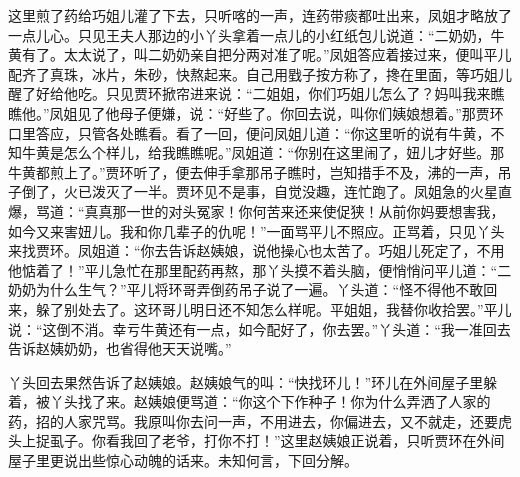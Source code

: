 \begin{parag}
    这里煎了药给巧姐儿灌了下去，只听喀的一声，连药带痰都吐出来，凤姐才略放了一点儿心。只见王夫人那边的小丫头拿着一点儿的小红纸包儿说道：“二奶奶，牛黄有了。太太说了，叫二奶奶亲自把分两对准了呢。”凤姐答应着接过来，便叫平儿配齐了真珠，冰片，朱砂，快熬起来。自己用戥子按方称了，搀在里面，等巧姐儿醒了好给他吃。只见贾环掀帘进来说：“二姐姐，你们巧姐儿怎么了？妈叫我来瞧瞧他。”凤姐见了他母子便嫌，说：“好些了。你回去说，叫你们姨娘想着。”那贾环口里答应，只管各处瞧看。看了一回，便问凤姐儿道：“你这里听的说有牛黄，不知牛黄是怎么个样儿，给我瞧瞧呢。”凤姐道：“你别在这里闹了，妞儿才好些。那牛黄都煎上了。”贾环听了，便去伸手拿那吊子瞧时，岂知措手不及，沸的一声，吊子倒了，火已泼灭了一半。贾环见不是事，自觉没趣，连忙跑了。凤姐急的火星直爆，骂道：“真真那一世的对头冤家！你何苦来还来使促狭！从前你妈要想害我，如今又来害妞儿。我和你几辈子的仇呢！”一面骂平儿不照应。正骂着，只见丫头来找贾环。凤姐道：“你去告诉赵姨娘，说他操心也太苦了。巧姐儿死定了，不用他惦着了！”平儿急忙在那里配药再熬，那丫头摸不着头脑，便悄悄问平儿道：“二奶奶为什么生气？”平儿将环哥弄倒药吊子说了一遍。丫头道：“怪不得他不敢回来，躲了别处去了。这环哥儿明日还不知怎么样呢。平姐姐，我替你收拾罢。”平儿说：“这倒不消。幸亏牛黄还有一点，如今配好了，你去罢。”丫头道：“我一准回去告诉赵姨奶奶，也省得他天天说嘴。”
\end{parag}


\begin{parag}
    丫头回去果然告诉了赵姨娘。赵姨娘气的叫：“快找环儿！”环儿在外间屋子里躲着，被丫头找了来。赵姨娘便骂道：“你这个下作种子！你为什么弄洒了人家的药，招的人家咒骂。我原叫你去问一声，不用进去，你偏进去，又不就走，还要虎头上捉虱子。你看我回了老爷，打你不打！”这里赵姨娘正说着，只听贾环在外间屋子里更说出些惊心动魄的话来。未知何言，下回分解。
\end{parag}